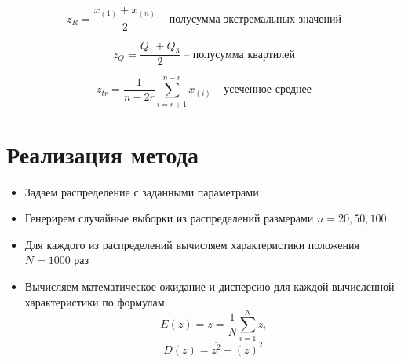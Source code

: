 \documentclass[12pt]{article}
\begin{document}
\begin{equation}
	\label{char:3}
	z_R = \frac{x_{(1)} + x_{(n)}}{2}  \;\text{-- полусумма экстремальных значений}
\end{equation}

\begin{equation}
	\label{char:4}
	z_Q = \frac{Q_1 + Q_3}{2}  \;\text{-- полусумма квартилей}
\end{equation}

\begin{equation}
	\label{char:5}
	z_{tr} = \frac{1}{n - 2r} \sum_{i = r + 1}^{n - r}{x_{(i)}}  \;\text{-- усеченное среднее}
\end{equation}



\section*{Реализация метода}
\begin{itemize}
    \item Задаем распределение с заданными параметрами 
    \item Генерирем случайные выборки из распределений размерами $n = 20, 50, 100$
    \item Для каждого из распределений вычисляем характеристики положения $N = 1000$ раз
    \item Вычисляем математическое ожидание и дисперсию для каждой вычисленной характеристики по формулам:
    \begin{equation}
    \label{moment:1}
      E(z) = \overline{z} = \frac{1}{N}\sum_{i=1}^{N}{z_i}
    \end{equation}
    \begin{equation}
    \label{moment:2}
      D(z) = \overline{z^2} - (\overline{z})^2
    \end{equation}
\end{itemize}
\end{document}

